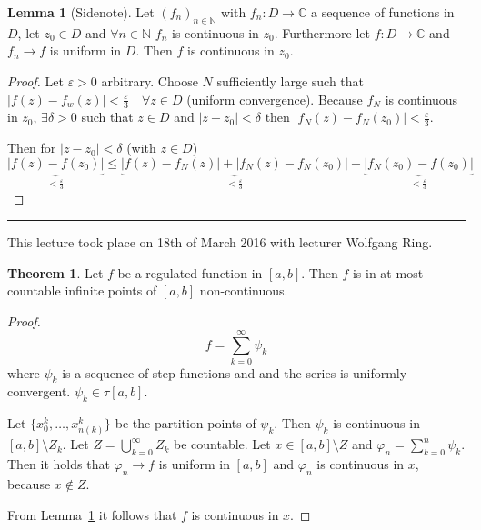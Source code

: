 \documentclass[a4paper,landscape,twocolumn]{article}
\theoremstyle{definition}
\newtheorem{theorem}{Theorem}
\newtheorem{lemma}{Lemma}
\newcommand\abs[1]{\left|#1\right|}
\newcommand\meta[3]{\hrule{} This #1 took place on #2 with lecturer #3.\par}
\begin{document}
\begin{lemma}[Sidenote]
  \label{lemma-cont-func-seq}
  Let $(f_n)_{n\in\mathbb N}$ with $f_n: D \to \mathbb C$ a sequence of functions
  in $D$, let $z_0 \in D$ and $\forall n \in \mathbb N$ $f_n$ is continuous in $z_0$.
  Furthermore let $f: D \to \mathbb C$ and $f_n \to f$ is uniform in $D$.
  Then $f$ is continuous in $z_0$.
\end{lemma}
\begin{proof}
  Let $\varepsilon > 0$ arbitrary. Choose $N$ sufficiently large such that
  $\abs{f(z) - f_w(z)} < \frac\varepsilon3 \quad \forall z \in D$ (uniform convergence).
  Because $f_N$ is continuous in $z_0$, $\exists \delta > 0$ such that
  $z \in D$ and $\abs{z - z_0} < \delta$ then $\abs{f_N(z) - f_N(z_0)} < \frac\varepsilon3$.

  Then for $\abs{z - z_0} < \delta$ (with $z \in D$)
  \[
    \underbrace{\abs{f(z) - f(z_0)}}_{< \frac\varepsilon3} \leq
    \underbrace{\abs{f(z) - f_N(z)} + \abs{f_N(z) - f_N(z_0)}}_{< \frac\varepsilon3} +
    \underbrace{\abs{f_N(z_0) - f(z_0)}}_{< \frac\varepsilon3}
  \]
\end{proof}

\meta{lecture}{18th of March 2016}{Wolfgang Ring}

\begin{theorem}
  Let $f$ be a regulated function in $[a,b]$.
  Then $f$ is in at most countable infinite points of $[a,b]$ non-continuous.
\end{theorem}
\begin{proof}
  \[ f = \sum_{k=0}^\infty \psi_k \]
  where $\psi_k$ is a sequence of step functions and
  and the series is uniformly convergent.
  $\psi_k \in \tau[a,b]$.

  Let $\{x_0^k, \ldots, x_{n(k)}^k\}$ be the partition points of $\psi_k$.
  Then $\psi_k$ is continuous in $[a,b] \setminus Z_k$.
  Let $Z = \bigcup_{k=0}^\infty Z_k$ be countable.
  Let $x \in [a,b] \setminus Z$ and $\varphi_n = \sum_{k=0}^n \psi_k$.
  Then it holds that $\varphi_n \to f$ is uniform in $[a,b]$ and $\varphi_n$
  is continuous in $x$, because $x \not\in Z$.

  From Lemma~\ref{lemma-cont-func-seq} it follows that
  $f$ is continuous in $x$.
\end{proof}
\end{document}
